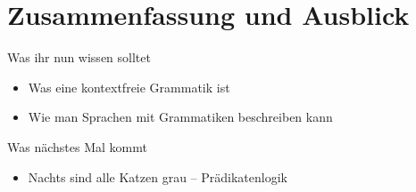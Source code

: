 

% 

\appendix
\beginbackup

\section{Zusammenfassung und Ausblick}

\begin{frame}
	\begin{block}{Was ihr nun wissen solltet}
		\begin{itemize}
			\item Was eine kontextfreie Grammatik ist
			\item Wie man Sprachen mit Grammatiken beschreiben kann
		\end{itemize}
	\end{block}
	
	\begin{block}{Was nächstes Mal kommt}
		\begin{itemize}
			\item Nachts sind alle Katzen grau -- Prädikatenlogik
		\end{itemize}
	\end{block}
\end{frame}	







\backupend

